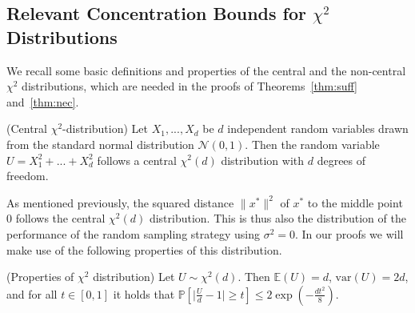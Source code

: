 \begin{subappendices}

\section{Relevant Concentration Bounds for $\chi^2$ Distributions}
\label{back}

We recall some basic definitions and properties of the central and the non-central $\chi^2$ distributions, which are needed in the proofs of Theorems~\ref{thm:suff} and~\ref{thm:nec}. %

\begin{definition}{(Central $\chi^2$-distribution)}
Let $X_1,...,X_d$ be $d$ independent random variables drawn from the standard normal distribution $\mathcal{N}(0,1)$. Then the random variable $U = X_1^2+...+X_d^2$ follows a central $\chi^2(d)$ distribution with $d$ degrees of freedom. 
\end{definition}
As mentioned previously, the squared distance $\lVert x^*\rVert^2$ of $x^*$ to the middle point $0$ follows the central $\chi^2(d)$ distribution. This is thus also the distribution of the performance of the random sampling strategy using $\sigma^2=0$. In our proofs we will make use of the following properties of this distribution. 
\begin{property}{(Properties of $\chi^2$ distribution)}
\label{ppty:chi2}
Let $U\sim \chi^2(d)$. Then $\mathbb{E}(U)=d$, $\text{var}(U) = 2d$, and for all $t\in[0,1]$ it holds that $\mathbb{P}\left[\lvert\frac{U}{d}-1\rvert\geq t\right]\leq 2\exp({-\frac{dt^2}{8}})$.
\end{property}


\end{subappendices}
